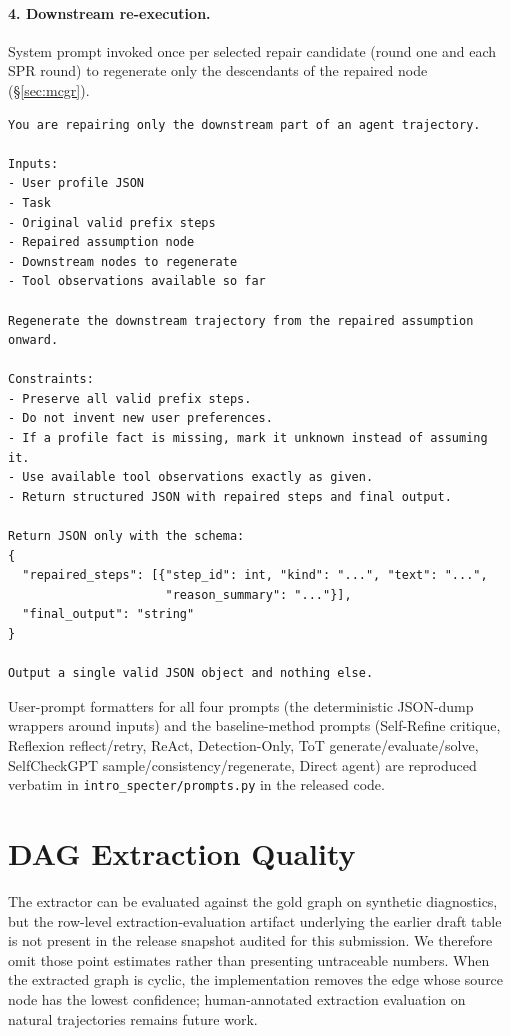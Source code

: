 \documentclass{article}
\begin{document}
\paragraph{4. Downstream re-execution.} System prompt invoked once per selected repair candidate (round one and each SPR round) to regenerate only the descendants of the repaired node (\S\ref{sec:mcgr}).

{\small\begin{verbatim}
You are repairing only the downstream part of an agent trajectory.

Inputs:
- User profile JSON
- Task
- Original valid prefix steps
- Repaired assumption node
- Downstream nodes to regenerate
- Tool observations available so far

Regenerate the downstream trajectory from the repaired assumption onward.

Constraints:
- Preserve all valid prefix steps.
- Do not invent new user preferences.
- If a profile fact is missing, mark it unknown instead of assuming it.
- Use available tool observations exactly as given.
- Return structured JSON with repaired steps and final output.

Return JSON only with the schema:
{
  "repaired_steps": [{"step_id": int, "kind": "...", "text": "...",
                      "reason_summary": "..."}],
  "final_output": "string"
}

Output a single valid JSON object and nothing else.
\end{verbatim}}

User-prompt formatters for all four prompts (the deterministic JSON-dump wrappers around inputs) and the baseline-method prompts (Self-Refine critique, Reflexion reflect/retry, ReAct, Detection-Only, ToT generate/evaluate/solve, SelfCheckGPT sample/consistency/regenerate, Direct agent) are reproduced verbatim in \texttt{intro\_specter/prompts.py} in the released code.

\section{DAG Extraction Quality}\label{app:dag-quality}
The extractor can be evaluated against the gold graph on synthetic diagnostics, but the row-level extraction-evaluation artifact underlying the earlier draft table is not present in the release snapshot audited for this submission. We therefore omit those point estimates rather than presenting untraceable numbers. When the extracted graph is cyclic, the implementation removes the edge whose source node has the lowest confidence; human-annotated extraction evaluation on natural trajectories remains future work.
\end{document}
